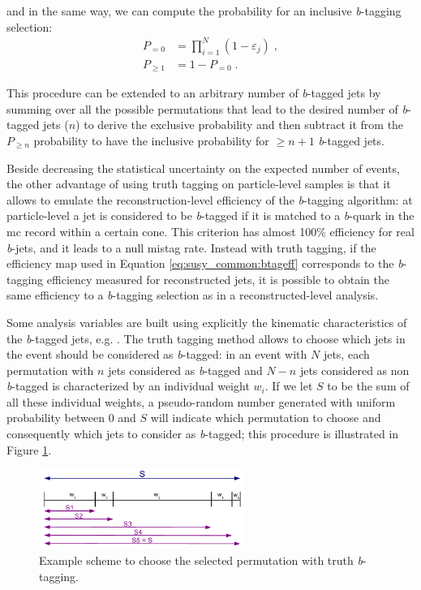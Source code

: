 \noindent and in the same way, we can compute the probability for an inclusive \textit{b}-tagging selection:
\begin{equation}
 \begin{split}
        P_{=0} &= \prod\limits_{i=1}^N \left( 1 - \varepsilon_{j} \right) \; ,\\
        P_{\geq 1} &= 1 - P_{=0} \; . \nonumber
 \end{split}
\end{equation} 
 
\noindent This procedure can be extended to an arbitrary number of \textit{b}-tagged jets by summing over all the possible permutations that lead to the desired number of \textit{b}-tagged jets ($n$) to derive the exclusive probability and then subtract it from the $P_{\geq n}$ probability to have the inclusive probability for $\geq n+1$ \textit{b}-tagged jets.
 
Beside decreasing the statistical uncertainty on the expected number of events, the other advantage of using truth tagging on particle-level samples is that it allows to emulate the reconstruction-level efficiency of the \textit{b}-tagging algorithm: 
at particle-level a jet is considered to be \textit{b}-tagged if it is matched to a \textit{b}-quark in the \gls{mc} record within a certain cone. This criterion has 
almost 100\% efficiency for real \textit{b}-jets, and it leads to a null mistag rate. Instead with truth tagging, if the efficiency map used in Equation \ref{eq:susy_common:btageff} corresponds to the \textit{b}-tagging efficiency measured for reconstructed jets, 
it is possible to obtain the same efficiency to a \textit{b}-tagging selection as in a reconstructed-level analysis. 

Some analysis variables are built using explicitly the kinematic characteristics of the \textit{b}-tagged jets, e.g. \mtb. The truth tagging method allows to choose which jets in the event should be considered as \textit{b}-tagged: in an event with $N$ jets, each permutation with $n$ jets considered as \textit{b}-tagged and $N-n$ jets considered as non \textit{b}-tagged is characterized by an individual weight $w_i$. If we let $S$ to be the sum of all these individual weights, a pseudo-random number generated with uniform probability between 0 and $S$ will indicate which permutation to choose and consequently which jets to consider as \textit{b}-tagged; this procedure is illustrated in Figure \ref{fig:susy_common_trf_perm}. 

\begin{figure}[h]
\centering 
\includegraphics[width=0.6\textwidth]{figures/susy_common/trf_perm}
\caption{Example scheme to choose the selected permutation with truth \textit{b}-tagging.}\label{fig:susy_common_trf_perm}
\end{figure}



